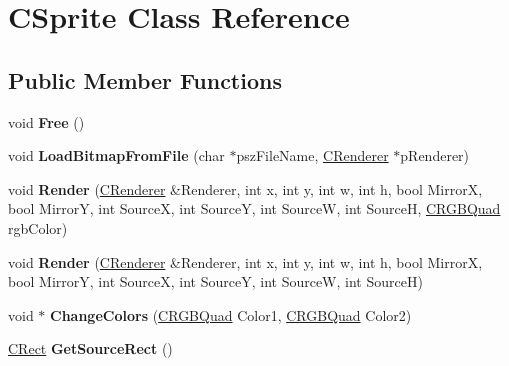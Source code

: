 \hypertarget{class_c_sprite}{}\section{C\+Sprite Class Reference}
\label{class_c_sprite}
\subsection*{Public Member Functions}
\begin{DoxyCompactItemize}
\item 
void {\bfseries Free} ()\hypertarget{class_c_sprite_aed204a19bd691cab7650b79c15671b3c}{}\label{class_c_sprite_aed204a19bd691cab7650b79c15671b3c}

\item 
void {\bfseries Load\+Bitmap\+From\+File} (char $\ast$psz\+File\+Name, \hyperlink{class_c_renderer}{C\+Renderer} $\ast$p\+Renderer)\hypertarget{class_c_sprite_a99bdfc8b270cf125536499087c2c32e6}{}\label{class_c_sprite_a99bdfc8b270cf125536499087c2c32e6}

\item 
void {\bfseries Render} (\hyperlink{class_c_renderer}{C\+Renderer} \&Renderer, int x, int y, int w, int h, bool MirrorX, bool MirrorY, int SourceX, int SourceY, int SourceW, int SourceH, \hyperlink{struct_c_r_g_b_quad}{C\+R\+G\+B\+Quad} rgb\+Color)\hypertarget{class_c_sprite_a2db097e840ad48379ce9b6a766db44af}{}\label{class_c_sprite_a2db097e840ad48379ce9b6a766db44af}

\item 
void {\bfseries Render} (\hyperlink{class_c_renderer}{C\+Renderer} \&Renderer, int x, int y, int w, int h, bool MirrorX, bool MirrorY, int SourceX, int SourceY, int SourceW, int SourceH)\hypertarget{class_c_sprite_aa9c3650801bd2cd9c6f8fe873eb8e7c9}{}\label{class_c_sprite_aa9c3650801bd2cd9c6f8fe873eb8e7c9}

\item 
void $\ast$ {\bfseries Change\+Colors} (\hyperlink{struct_c_r_g_b_quad}{C\+R\+G\+B\+Quad} Color1, \hyperlink{struct_c_r_g_b_quad}{C\+R\+G\+B\+Quad} Color2)\hypertarget{class_c_sprite_a230cfd8de09f908a6ea13606295f9e3d}{}\label{class_c_sprite_a230cfd8de09f908a6ea13606295f9e3d}

\item 
\hyperlink{struct_c_rect}{C\+Rect} {\bfseries Get\+Source\+Rect} ()\hypertarget{class_c_sprite_a7101772fb9b2635f33e191b0c10d3319}{}\label{class_c_sprite_a7101772fb9b2635f33e191b0c10d3319}


\end{DoxyCompactItemize}
